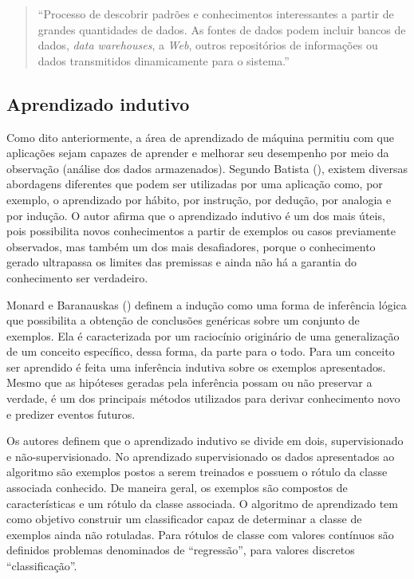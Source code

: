 \begin{quote}
    “Processo de descobrir padrões e conhecimentos interessantes a partir de grandes quantidades de dados. As fontes de dados podem incluir bancos de dados, \textit{data warehouses}, a \textit{Web}, outros repositórios de informações ou dados transmitidos dinamicamente para o sistema.” 
\end{quote}

\subsection{Aprendizado indutivo}

Como dito anteriormente, a área de aprendizado de máquina permitiu com que aplicações sejam capazes de aprender e melhorar seu desempenho por meio da observação (análise dos dados armazenados). Segundo Batista (\citeyear{Batista}), existem diversas abordagens diferentes que podem ser utilizadas por uma aplicação como, por exemplo, o aprendizado por hábito, por instrução, por dedução, por analogia e por indução. O autor afirma que o aprendizado indutivo é um dos mais úteis, pois possibilita novos conhecimentos a partir de exemplos ou casos previamente observados, mas também um dos mais desafiadores, porque o conhecimento gerado ultrapassa os limites das premissas e ainda não há a garantia do conhecimento ser verdadeiro.

Monard e Baranauskas (\citeyear{Monard:2003}) definem a indução como uma forma de inferência lógica que possibilita a obtenção de conclusões genéricas sobre um conjunto de exemplos. Ela é caracterizada por um raciocínio originário de uma generalização de um conceito específico, dessa forma, da parte para o todo. Para um conceito ser aprendido é feita uma inferência indutiva sobre os exemplos apresentados. Mesmo que as hipóteses geradas pela inferência possam ou não preservar a verdade, é um dos principais métodos utilizados para derivar conhecimento novo e predizer eventos futuros.

Os autores definem que o aprendizado indutivo se divide em dois, supervisionado e não-supervisionado. No aprendizado supervisionado os dados apresentados ao algoritmo são exemplos postos a serem treinados e possuem o rótulo da classe associada conhecido. De maneira geral, os exemplos são compostos de características e um rótulo da classe associada. O algoritmo de aprendizado tem como objetivo construir um classificador capaz de determinar a classe de exemplos ainda não rotuladas. Para rótulos de classe com valores contínuos são definidos problemas denominados de “regressão”, para valores discretos  “classificação”.

